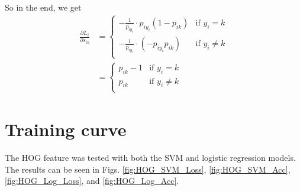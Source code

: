 \documentclass[11pt]{article}
\begin{document}
So in the end, we get
\begin{align*}
	\frac{\partial L_i}{\partial s_{ik}}
	&=\begin{cases}
		-\frac{1}{p_{iy_i}}\cdot p_{iy_i}\left(1-p_{ik}\right) & \text{if }y_i=k\\
		-\frac{1}{p_{iy_i}}\cdot\left(-p_{iy_i}p_{ik}\right) & \text{if }y_i\neq k\\
	\end{cases}\\
	&=\begin{cases}
		p_{ik}-1 & \text{if }y_i=k\\
		p_{ik} & \text{if }y_i\neq k\\
	\end{cases}
\end{align*}


\section*{Training curve}
The HOG feature was tested with both the SVM and logistic regression models.
The results can be seen in Figs. \ref{fig:HOG_SVM_Loss}, \ref{fig:HOG_SVM_Acc}, \ref{fig:HOG_Log_Loss}, and \ref{fig:HOG_Log_Acc}.
\end{document}
